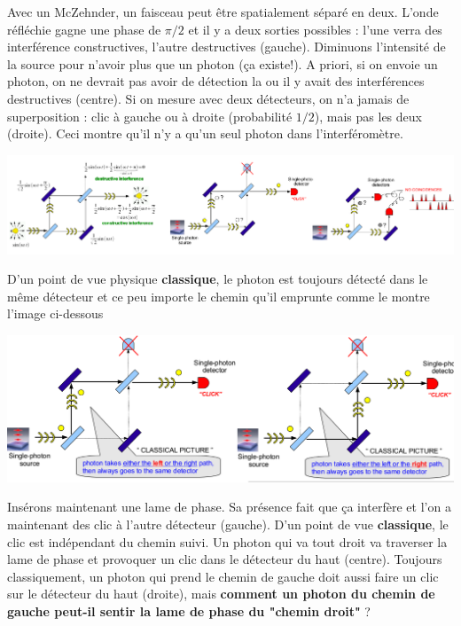 Avec un McZehnder, un faisceau peut être spatialement séparé en deux. L'onde réfléchie gagne une
phase de $\pi/2$ et il y a deux sorties possibles : l'une verra des interférence constructives,
l'autre destructives (gauche). Diminuons l'intensité de la source pour n'avoir plus que un photon (ça existe!). A priori, si on envoie un photon, on ne devrait pas avoir de détection la ou il y avait des
interférences destructives (centre). Si on mesure avec deux détecteurs, on n'a jamais de superposition :
clic à gauche ou à droite (probabilité $1/2$), mais pas les deux (droite). Ceci montre qu'il n'y a 
qu'un seul photon dans l'interféromètre.

\begin{center}
	\includegraphics[scale=0.25]{ch1/image3.png}
\end{center}
\newpage
D'un point de vue physique \textbf{classique}, le photon est toujours détecté dans le même détecteur
et ce peu importe le chemin qu'il emprunte comme le montre l'image ci-dessous
\begin{center}
	\includegraphics[scale=0.3]{ch1/image4.png}
\end{center}

Insérons maintenant une lame de phase. Sa présence fait que ça interfère et l'on a maintenant des
clic à l'autre détecteur (gauche). D'un point de vue \textbf{classique}, le clic est indépendant
du chemin suivi. Un photon qui va tout droit va traverser la lame de phase et provoquer un clic
dans le détecteur du haut (centre). Toujours classiquement, un photon qui prend le chemin de 
gauche doit aussi faire un clic sur le détecteur du haut (droite), mais \textbf{comment un photon du
chemin de gauche peut-il sentir la lame de phase du "chemin droit"} ? 


